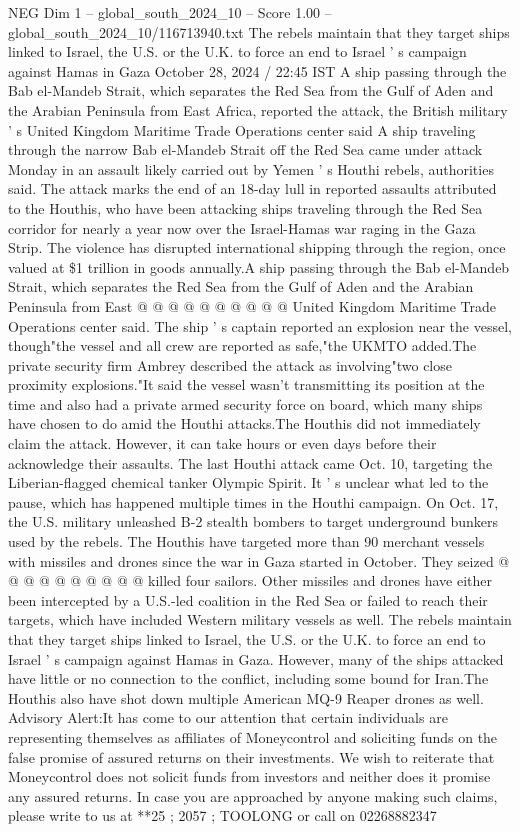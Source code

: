 \begin{textsample}{NEG Dim 1 – global\_south\_2024\_10 – Score 1.00 – global\_south\_2024\_10/116713940.txt}  \label{ex:f1_neg_281}
The rebels maintain that they target ships linked to Israel, the U.S. or the U.K. to force an end to Israel ' s campaign against Hamas in Gaza October 28, 2024 / 22:45 IST A ship passing through the Bab el-Mandeb Strait, which separates the Red Sea from the Gulf of Aden and the Arabian Peninsula from East Africa, reported the attack, the British military ' s United Kingdom Maritime Trade Operations center said A ship traveling through the narrow Bab el-Mandeb Strait off the Red Sea came under attack Monday in an assault likely carried out by Yemen ' s Houthi rebels, authorities said.
The attack marks the end of an 18-day lull in reported assaults attributed to the Houthis, who have been attacking ships traveling through the Red Sea corridor for nearly a year now over the Israel-Hamas war raging in the Gaza Strip.
The violence has disrupted international shipping through the region, once valued at \$1 trillion in goods annually.A ship passing through the Bab el-Mandeb Strait, which separates the Red Sea from the Gulf of Aden and the Arabian Peninsula from East @ @ @ @ @ @ @ @ @ @ United Kingdom Maritime Trade Operations center said.
The ship ' s captain reported an explosion near the vessel, though"the vessel and all crew are reported as safe,"the UKMTO added.The private security firm Ambrey described the attack as involving"two close proximity explosions."It said the vessel wasn't transmitting its position at the time and also had a private armed security force on board, which many ships have chosen to do amid the Houthi attacks.The Houthis did not immediately claim the attack.
However, it can take hours or even days before their acknowledge their assaults.
The last Houthi attack came Oct. 10, targeting the Liberian-flagged chemical tanker Olympic Spirit.
It ' s unclear what led to the pause, which has happened multiple times in the Houthi campaign.
On Oct. 17, the U.S. military unleashed B-2 stealth bombers to target underground bunkers used by the rebels.
The Houthis have targeted more than 90 merchant vessels with missiles and drones since the war in Gaza started in October.
They seized @ @ @ @ @ @ @ @ @ @ killed four sailors.
Other missiles and drones have either been intercepted by a U.S.-led coalition in the Red Sea or failed to reach their targets, which have included Western military vessels as well.
The rebels maintain that they target ships linked to Israel, the U.S. or the U.K. to force an end to Israel ' s campaign against Hamas in Gaza.
However, many of the ships attacked have little or no connection to the conflict, including some bound for Iran.The Houthis also have shot down multiple American MQ-9 Reaper drones as well.
Advisory Alert:It has come to our attention that certain individuals are representing themselves as affiliates of Moneycontrol and soliciting funds on the false promise of assured returns on their investments.
We wish to reiterate that Moneycontrol does not solicit funds from investors and neither does it promise any assured returns.
In case you are approached by anyone making such claims, please write to us at **25 ; 2057 ; TOOLONG or call on 02268882347

\end{textsample}
